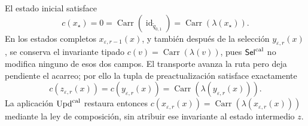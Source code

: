 El estado inicial satisface
\[
 c(x_\star)=0=\operatorname{Carr}
   (\operatorname{id}_{\widetilde q_{0,1}})
   =\operatorname{Carr}(\lambda(x_\star)).
\]
En los estados completos \(x_{\varepsilon,r-1}(x)\), y también después de la
selección \(y_{\varepsilon,r}(x)\), se conserva el invariante tipado
\(c(v)=\operatorname{Carr}(\lambda(v))\), pues
\(\mathsf{Sel}^{\rm cal}\) no modifica ninguno de esos dos campos. El
transporte avanza la ruta pero deja pendiente el acarreo; por ello la tupla de
preactualización satisface exactamente
\[
 c(z_{\varepsilon,r}(x))=c(y_{\varepsilon,r}(x))
 =\operatorname{Carr}(\lambda(y_{\varepsilon,r}(x))).
\]
La aplicación \(\operatorname{Upd}^{\rm cal}\) restaura entonces
\(c(x_{\varepsilon,r}(x))=
\operatorname{Carr}(\lambda(x_{\varepsilon,r}(x)))\) mediante la ley de
composición, sin atribuir ese invariante al estado intermedio \(z\).

